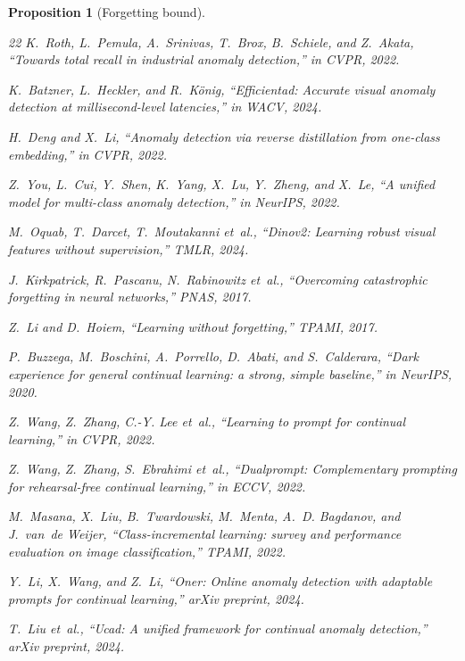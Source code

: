 \documentclass[conference]{IEEEtran}
\newtheorem{proposition}{Proposition}
\begin{document}
\begin{proposition}[Forgetting bound]
\begin{thebibliography}{22}
K.~Roth, L.~Pemula, A.~Srinivas, T.~Brox, B.~Schiele, and Z.~Akata, ``Towards total recall in industrial anomaly detection,'' in \emph{CVPR}, 2022.

K.~Batzner, L.~Heckler, and R.~K{\"o}nig, ``Efficientad: Accurate visual anomaly detection at millisecond-level latencies,'' in \emph{WACV}, 2024.

H.~Deng and X.~Li, ``Anomaly detection via reverse distillation from one-class embedding,'' in \emph{CVPR}, 2022.

Z.~You, L.~Cui, Y.~Shen, K.~Yang, X.~Lu, Y.~Zheng, and X.~Le, ``A unified model for multi-class anomaly detection,'' in \emph{NeurIPS}, 2022.

M.~Oquab, T.~Darcet, T.~Moutakanni \emph{et~al.}, ``Dinov2: Learning robust visual features without supervision,'' \emph{TMLR}, 2024.

J.~Kirkpatrick, R.~Pascanu, N.~Rabinowitz \emph{et~al.}, ``Overcoming catastrophic forgetting in neural networks,'' \emph{PNAS}, 2017.

Z.~Li and D.~Hoiem, ``Learning without forgetting,'' \emph{TPAMI}, 2017.

P.~Buzzega, M.~Boschini, A.~Porrello, D.~Abati, and S.~Calderara, ``Dark experience for general continual learning: a strong, simple baseline,'' in \emph{NeurIPS}, 2020.

Z.~Wang, Z.~Zhang, C.-Y. Lee \emph{et~al.}, ``Learning to prompt for continual learning,'' in \emph{CVPR}, 2022.

Z.~Wang, Z.~Zhang, S.~Ebrahimi \emph{et~al.}, ``Dualprompt: Complementary prompting for rehearsal-free continual learning,'' in \emph{ECCV}, 2022.

M.~Masana, X.~Liu, B.~Twardowski, M.~Menta, A.~D. Bagdanov, and J.~van~de Weijer, ``Class-incremental learning: survey and performance evaluation on image classification,'' \emph{TPAMI}, 2022.

Y.~Li, X.~Wang, and Z.~Li, ``Oner: Online anomaly detection with adaptable prompts for continual learning,'' \emph{arXiv preprint}, 2024.

T.~Liu \emph{et~al.}, ``Ucad: A unified framework for continual anomaly detection,'' \emph{arXiv preprint}, 2024.


\end{thebibliography}
\end{proposition}
\end{document}

